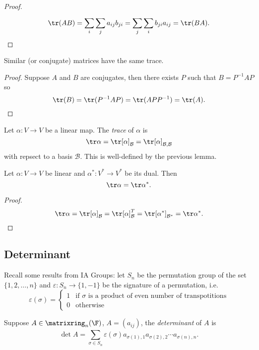 \documentclass[a4paper]{article}
\newcommand*{\M}{\matrixring}
\newcommand*{\basis}{\mathcal}
\theoremstyle{definition}
\begin{document}
\begin{proof}
  \[
    \tr(AB) = \sum_{i}^{ }\sum_{j}^{ }a_{ij}b_{ji} = \sum_{j}^{ }\sum_{i}^{ }b_{ji}a_{ij} = \tr(BA).
  \]
\end{proof}

\begin{lemma}
  Similar (or conjugate) matrices have the same trace.
\end{lemma}

\begin{proof}
  Suppose \(A\) and \(B\) are conjugates, then there exists \(P\) such that \(B = P^{-1}AP\) so
  \[
    \tr(B) = \tr(P^{-1}AP) = \tr(APP^{-1}) = \tr(A).
  \]
\end{proof}

\begin{definition}[Trace]
  Let \(\alpha: V \to V\) be a linear map. The \emph{trace} of \(\alpha\) is
  \[
    \tr \alpha = \tr[\alpha]_{\basis B} = \tr [\alpha]_{\basis B, \basis B}
  \]
  with repsect to a basis \(\basis B\). This is well-defined by the previous lemma.
\end{definition}

\begin{lemma}
  Let \(\alpha: V \to V\) be linear and \(\alpha^*: V^* \to V^*\) be its dual. Then
  \[
    \tr \alpha = \tr \alpha^*.
  \]
\end{lemma}

\begin{proof}
  \[
    \tr \alpha = \tr [\alpha]_{\basis B} = \tr [\alpha]_{\basis B}^T = \tr[\alpha^*]_{\basis B^*} = \tr \alpha^*.
  \]
\end{proof}

\subsection{Determinant}

Recall some results from IA Groups: let \(S_n\) be the permutation group of the set \(\{1, 2, \dots, n\}\) and \(\varepsilon: S_n \to \{1, -1\}\) be the signature of a permutation, i.e.
\[
  \varepsilon(\sigma) =
  \begin{cases}
    1 &\text{if \(\sigma\) is a product of even number of transpotitions}\\
    0 &\text{otherwise}
  \end{cases}
\]

\begin{definition}[Determinant]
  Suppose \(A \in \M_n(\F)\), \(A = (a_{ij})\), the \emph{determinant} of \(A\) is
  \[
    \det A = \sum_{\sigma \in S_n}^{ } \varepsilon(\sigma) a_{\sigma(1), 1} a_{\sigma(2), 2} \cdots a_{\sigma(n), n}.
  \]
\end{definition}
\end{document}
